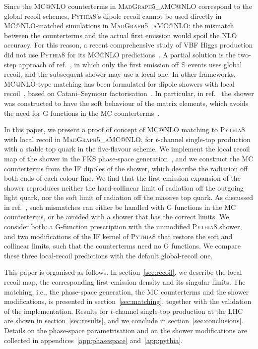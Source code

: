 \documentclass[a4paper,11pt]{article}
\makeatletter
\newcommand{\mgamc}{\textsc{MadGraph5\_aMC@NLO}\xspace}
\newcommand{\mcatnlo}{MC@NLO\xspace}
\newcommand{\pythia}{\textsc{Pythia8}\xspace}
\newcommand{\clS}{\mathbb{S}}
\makeatother
\begin{document}
Since the \mcatnlo counterterms in \mgamc correspond to the global
recoil schemes, \pythia's dipole recoil cannot be used directly in
\mcatnlo-matched simulations in \mgamc: the mismatch between the
counterterms and the actual first emission would spoil the NLO
accuracy. For this reason, a recent comprehensive study of VBF Higgs
production did not use \pythia for its \mcatnlo
predictions~\cite{Barone:2025jey}. A partial solution is the two-step
approach of ref.~\cite{Frederix:2024psm}, in which only the first
emission off $\clS$ events uses global recoil, and the subsequent
shower may use a local one. In other frameworks, \mcatnlo-type
matching has been
formulated for dipole showers with local
recoil~\cite{Hoeche:2011fd,Platzer:2011bc}, based on Catani--Seymour
factorisation~\cite{Schumann:2007mg,Platzer:2009jq}. In particular,
in ref.~\cite{Hoeche:2011fd} the shower was constructed to have the
soft behaviour of the matrix elements, which avoids the need for G
functions in the MC counterterms~\cite{Alwall:2014hca}.

In this paper, we present a proof of concept of \mcatnlo matching to
\pythia with local recoil in \mgamc, for $t$-channel single-top
production with a stable top quark in the five-flavour scheme. We
implement the local recoil map of the shower in the FKS phase-space
generation~\cite{Frixione:1995ms,Frixione:1997np,Frederix:2009yq}, and
we construct the MC counterterms from the IF dipoles of the shower,
which describe the radiation off both ends of each colour line. We
find that the first-emission expansion of the shower reproduces
neither the hard-collinear limit of radiation off the outgoing light
quark, nor the soft limit of radiation off the massive top quark. As
discussed in ref.~\cite{Alwall:2014hca}, such mismatches can either be
handled with G functions in the MC counterterms, or be avoided with a
shower that has the correct limits. We consider both: a G-function
prescription with the unmodified \pythia shower, and two modifications
of the IF kernel of \pythia that restore the soft and collinear
limits, such that the counterterms need no G functions. We compare
these three local-recoil predictions with the default global-recoil one.

This paper is organised as follows. In section~\ref{sec:recoil}, we
describe the local recoil map, the corresponding first-emission
density and its singular limits. The matching, i.e., the phase-space
generation, the MC counterterms and the shower modifications, is
presented in section~\ref{sec:matching}, together with the validation
of the implementation. Results for $t$-channel single-top production at
the LHC are shown in section~\ref{sec:results}, and we conclude in
section~\ref{sec:conclusions}. Details on the phase-space
parametrisation and on the shower modifications are collected in
appendices~\ref{app:phasespace} and~\ref{app:pythia}.
\end{document}
